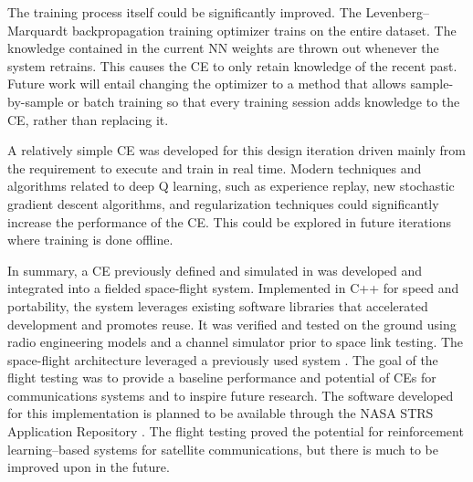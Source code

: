 \documentclass[journal]{IEEEtran}
\let\MYoriglatexcaption\caption
\renewcommand{\caption}[2][\relax]{\MYoriglatexcaption[#2]{#2}}
\begin{document}
The training process itself could be significantly improved. The Levenberg--Marquardt backpropagation training optimizer trains on the entire dataset.  The knowledge contained in the current NN weights are thrown out whenever the system retrains.  This causes the CE to only retain knowledge of the recent past.  Future work will entail changing the optimizer to a method that allows sample-by-sample or batch training so that every training session adds knowledge to the CE, rather than replacing it.

A relatively simple CE was developed for this design iteration driven mainly from the requirement to execute and train in real time.  Modern techniques and algorithms related to deep Q learning, such as experience replay, new stochastic gradient descent algorithms, and regularization techniques could significantly increase the performance of the CE.  This could be explored in future iterations where training is done offline.

In summary, a CE previously defined and simulated in \cite{aiaa-paulo,paulo-ccaa-paper, paulo-jrnl} was developed and integrated into a fielded space-flight system.  Implemented in C++ for speed and portability, the system leverages existing software libraries that accelerated development and promotes reuse.  It was verified and tested on the ground using radio engineering models and a channel simulator prior to space link testing.  The space-flight architecture leveraged a previously used system \cite{downey-paper}.  The goal of the flight testing was to provide a baseline performance and potential of CEs for communications systems and to inspire future research.  The software developed for this implementation is planned to be available through the NASA STRS Application Repository \cite{strs-repo}.  The flight testing proved the potential for reinforcement learning--based systems for satellite communications, but there is much to be improved upon in the future.

%
%
\end{document}
